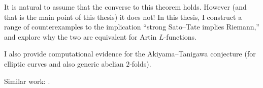 It is natural to assume that the converse to this theorem holds. However (and 
that is the main point of this thesis) it does not! In this thesis, I construct 
a range of counterexamples to the implication ``strong Sato--Tate implies 
Riemann,'' and explore why the two are equivalent for Artin $L$-functions. 

I also provide computational evidence for the Akiyama--Tanigawa conjecture 
(for elliptic curves and also generic abelian $2$-folds). 

Similar work: \cite{pande-2011}. 
